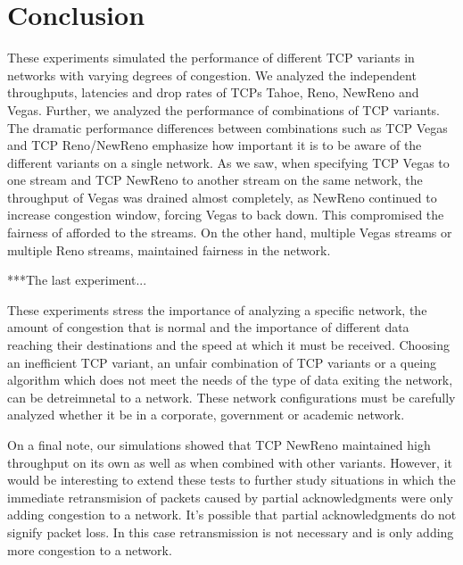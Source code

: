 \section{Conclusion}

These experiments simulated the performance of different TCP variants in networks with varying degrees of congestion. We analyzed the independent throughputs, latencies and drop rates of TCPs Tahoe, Reno, NewReno and Vegas. Further, we analyzed the performance of combinations of TCP variants. The dramatic performance differences between combinations such as TCP Vegas and TCP Reno/NewReno emphasize how important it is to be aware of the different variants on a single network. As we saw, when specifying TCP Vegas to one stream and TCP NewReno to another stream on the same network, the throughput of Vegas was drained almost completely, as NewReno continued to increase congestion window, forcing Vegas to back down. This compromised the fairness of afforded to the streams. On the other hand, multiple Vegas streams or multiple Reno streams, maintained fairness in the network.

***The last experiment...

These experiments stress the importance of analyzing a specific network, the amount of congestion that is normal and the importance of different data reaching their destinations and the speed at which it must be received. Choosing an inefficient TCP variant, an unfair combination of TCP variants or a queing algorithm which does not meet the needs of the type of data exiting the network, can be detreimnetal to a network. These network configurations must be carefully analyzed whether it be in a corporate, government or academic network.

On a final note, our simulations showed that TCP NewReno maintained high throughput on its own as well as when combined with other variants. However, it would be interesting to extend these tests to further study situations in which the immediate retransmision of packets caused by partial acknowledgments were only adding congestion to a network. It's possible that partial acknowledgments do not signify packet loss. In this case retransmission is not necessary and is only adding more congestion to a network.